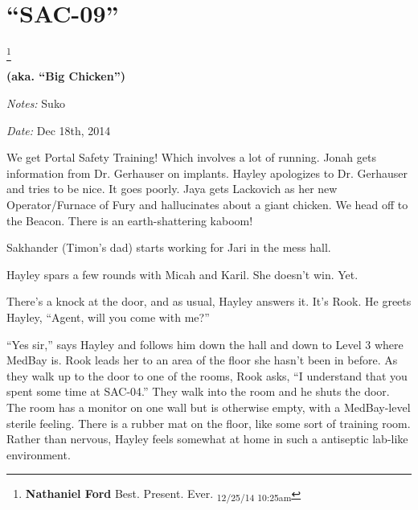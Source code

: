 \setcounter{chapter}{ 38 }
\chapter{\textbf{``SAC-09''} }
\footnote{\textbf{Nathaniel Ford }Best. Present. Ever. \textsubscript{12/25/14 10:25am}}



\begin{center}
 {\LARGE \textbf{(aka. ``Big Chicken'')} } 
\end{center}




\textit{Notes:} Suko

\textit{Date:} Dec 18th, 2014



We get Portal Safety Training!  Which involves a lot of running.  Jonah gets information from Dr. Gerhauser on implants.  Hayley apologizes to Dr. Gerhauser and tries to be nice.  It goes poorly.   Jaya gets Lackovich as her new Operator/Furnace of Fury and hallucinates about a giant chicken.  We head off to the Beacon.  There is an earth-shattering kaboom!





\noindent\hrulefill







Sakhander (Timon's dad) starts working for Jari in the mess hall.



Hayley spars a few rounds with Micah and Karil.  She doesn't win.  Yet.





There's a knock at the door, and as usual, Hayley answers it. It's Rook.   He greets Hayley, ``Agent, will you come with me?''

``Yes sir,'' says Hayley and follows him down the hall and down to Level 3 where MedBay is.  Rook leads her to an area of the floor she hasn't been in before.  As they walk up to the door to one of the rooms, Rook asks, ``I understand that you spent some time at SAC-04.''  They walk into the room and he shuts the door.  The room has a monitor on one wall but is otherwise empty, with a MedBay-level sterile feeling.  There is a rubber mat on the floor, like some sort of training room.  Rather than nervous, Hayley feels somewhat at home in such a antiseptic lab-like environment.

